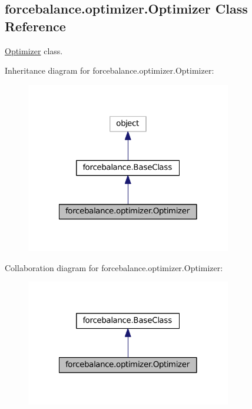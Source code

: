 \hypertarget{classforcebalance_1_1optimizer_1_1Optimizer}{\subsection{forcebalance.\-optimizer.\-Optimizer Class Reference}
\label{classforcebalance_1_1optimizer_1_1Optimizer}
}


\hyperlink{classforcebalance_1_1optimizer_1_1Optimizer}{Optimizer} class.  




Inheritance diagram for forcebalance.\-optimizer.\-Optimizer\-:\nopagebreak
\begin{figure}[H]
\begin{center}
\leavevmode
\includegraphics[width=254pt]{classforcebalance_1_1optimizer_1_1Optimizer__inherit__graph}
\end{center}
\end{figure}


Collaboration diagram for forcebalance.\-optimizer.\-Optimizer\-:\nopagebreak
\begin{figure}[H]
\begin{center}
\leavevmode
\includegraphics[width=254pt]{classforcebalance_1_1optimizer_1_1Optimizer__coll__graph}
\end{center}
\end{figure}
